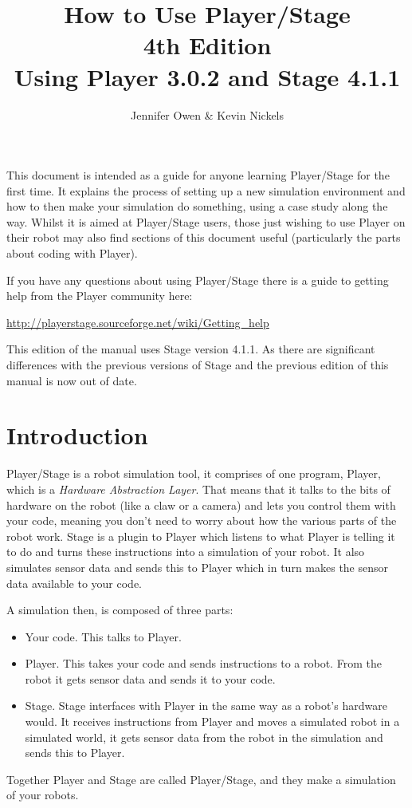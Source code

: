 \documentclass[a4paper]{report}
\title{How to Use Player/Stage\\ 
\large 4th Edition \\
\small Using Player 3.0.2 and Stage 4.1.1}
\author{Jennifer Owen \& Kevin Nickels}
\newcommand{\plst}{Player/Stage\xspace}
\newcommand{\pl}{Player\xspace}
\begin{document}
\maketitle


This document is intended as a guide for anyone learning \plst for the first time. It explains the process of setting up a new simulation environment and how to then make your simulation do something, using a case study along the way. Whilst it is aimed at \plst users, those just wishing to use \pl on their robot may also find sections of this document useful (particularly the parts about coding with Player).

If you have any questions about using \plst there is a guide to getting help from the \pl community here:
\begin{center}
	\url{http://playerstage.sourceforge.net/wiki/Getting_help}
\end{center}
This edition of the manual uses Stage version 4.1.1.  As there are significant differences with the previous versions of Stage and the previous edition of this manual is now out of date. 

\tableofcontents

\chapter{Introduction}\label{sec:Introduction}
\plst is a robot simulation tool, it comprises of one program, \pl, which is a \emph{Hardware Abstraction Layer}. That means that it talks to the bits of hardware on the robot (like a claw or a camera) and lets you control them with your code, meaning you don't need to worry about how the various parts of the robot work. Stage is a plugin to \pl which listens to what \pl is telling it to do and turns these instructions into a simulation of your robot. It also simulates sensor data and sends this to \pl which in turn makes the sensor data available to your code.

A simulation then, is composed of three parts:
\begin{itemize}
\item Your code. This talks to \pl.
\item \pl. This takes your code and sends instructions to a robot. From the robot it gets sensor data and sends it to your code.
\item Stage. Stage interfaces with \pl in the same way as a robot's hardware would. It receives instructions from \pl and moves a simulated robot in a simulated world, it gets sensor data from the robot in the simulation and sends this to \pl.
\end{itemize}
Together \pl and Stage are called \plst, and they make a simulation of your robots.
\end{document}
